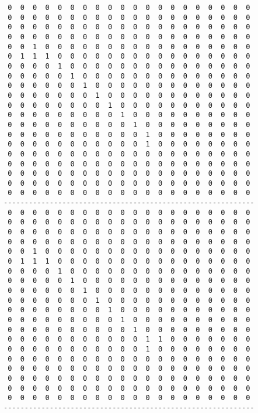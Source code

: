 \begin{verbatim}
 0  0  0  0  0  0  0  0  0  0  0  0  0  0  0  0  0  0  0  0
 0  0  0  0  0  0  0  0  0  0  0  0  0  0  0  0  0  0  0  0
 0  0  0  0  0  0  0  0  0  0  0  0  0  0  0  0  0  0  0  0
 0  0  0  0  0  0  0  0  0  0  0  0  0  0  0  0  0  0  0  0
 0  0  1  0  0  0  0  0  0  0  0  0  0  0  0  0  0  0  0  0
 0  1  1  1  0  0  0  0  0  0  0  0  0  0  0  0  0  0  0  0
 0  0  0  0  1  0  0  0  0  0  0  0  0  0  0  0  0  0  0  0
 0  0  0  0  0  1  0  0  0  0  0  0  0  0  0  0  0  0  0  0
 0  0  0  0  0  0  1  0  0  0  0  0  0  0  0  0  0  0  0  0
 0  0  0  0  0  0  0  1  0  0  0  0  0  0  0  0  0  0  0  0
 0  0  0  0  0  0  0  0  1  0  0  0  0  0  0  0  0  0  0  0
 0  0  0  0  0  0  0  0  0  1  0  0  0  0  0  0  0  0  0  0
 0  0  0  0  0  0  0  0  0  0  1  0  0  0  0  0  0  0  0  0
 0  0  0  0  0  0  0  0  0  0  0  1  0  0  0  0  0  0  0  0
 0  0  0  0  0  0  0  0  0  0  0  1  0  0  0  0  0  0  0  0
 0  0  0  0  0  0  0  0  0  0  0  0  0  0  0  0  0  0  0  0
 0  0  0  0  0  0  0  0  0  0  0  0  0  0  0  0  0  0  0  0
 0  0  0  0  0  0  0  0  0  0  0  0  0  0  0  0  0  0  0  0
 0  0  0  0  0  0  0  0  0  0  0  0  0  0  0  0  0  0  0  0
 0  0  0  0  0  0  0  0  0  0  0  0  0  0  0  0  0  0  0  0
------------------------------------------------------------
 0  0  0  0  0  0  0  0  0  0  0  0  0  0  0  0  0  0  0  0
 0  0  0  0  0  0  0  0  0  0  0  0  0  0  0  0  0  0  0  0
 0  0  0  0  0  0  0  0  0  0  0  0  0  0  0  0  0  0  0  0
 0  0  0  0  0  0  0  0  0  0  0  0  0  0  0  0  0  0  0  0
 0  0  1  0  0  0  0  0  0  0  0  0  0  0  0  0  0  0  0  0
 0  1  1  1  0  0  0  0  0  0  0  0  0  0  0  0  0  0  0  0
 0  0  0  0  1  0  0  0  0  0  0  0  0  0  0  0  0  0  0  0
 0  0  0  0  0  1  0  0  0  0  0  0  0  0  0  0  0  0  0  0
 0  0  0  0  0  0  1  0  0  0  0  0  0  0  0  0  0  0  0  0
 0  0  0  0  0  0  0  1  0  0  0  0  0  0  0  0  0  0  0  0
 0  0  0  0  0  0  0  0  1  0  0  0  0  0  0  0  0  0  0  0
 0  0  0  0  0  0  0  0  0  1  0  0  0  0  0  0  0  0  0  0
 0  0  0  0  0  0  0  0  0  0  1  0  0  0  0  0  0  0  0  0
 0  0  0  0  0  0  0  0  0  0  0  1  1  0  0  0  0  0  0  0
 0  0  0  0  0  0  0  0  0  0  0  1  0  0  0  0  0  0  0  0
 0  0  0  0  0  0  0  0  0  0  0  0  0  0  0  0  0  0  0  0
 0  0  0  0  0  0  0  0  0  0  0  0  0  0  0  0  0  0  0  0
 0  0  0  0  0  0  0  0  0  0  0  0  0  0  0  0  0  0  0  0
 0  0  0  0  0  0  0  0  0  0  0  0  0  0  0  0  0  0  0  0
 0  0  0  0  0  0  0  0  0  0  0  0  0  0  0  0  0  0  0  0
------------------------------------------------------------
\end{verbatim}
